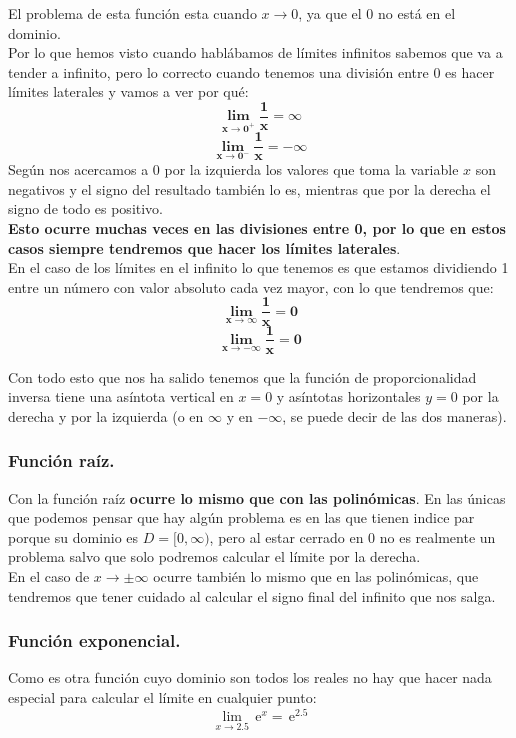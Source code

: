 \documentclass[a4paper,11pt,answers]{exam}
\newcommand{\e}{\,\mathrm{e}}
\begin{document}
El problema de esta función esta cuando $x \to 0$, ya que el 0 no está en el dominio.\\
Por lo que hemos visto cuando hablábamos de límites infinitos sabemos que va a tender a infinito, pero lo correcto cuando tenemos una división entre 0 es hacer límites laterales y vamos a ver por qué:
\[\boldsymbol{\lim_{x \to 0^+}\frac{1}{x} = \infty}\]
\[\boldsymbol{\lim_{x \to 0^-}\frac{1}{x} = -\infty}\]
Según nos acercamos a 0 por la izquierda los valores que toma la variable $x$ son negativos y el signo del resultado también lo es, mientras que por la derecha el signo de todo es positivo.\\
\textbf{Esto ocurre muchas veces en las divisiones entre 0, por lo que en estos casos siempre tendremos que hacer los límites laterales}.\\

En el caso de los límites en el infinito lo que tenemos es que estamos dividiendo 1 entre un número con valor absoluto cada vez mayor, con lo que tendremos que:
\[\boldsymbol{\lim_{x \to \infty} \frac{1}{x} = 0}\]
\[\boldsymbol{\lim_{x \to -\infty} \frac{1}{x} = 0}\]

Con todo esto que nos ha salido tenemos que la función de proporcionalidad inversa tiene una asíntota vertical en $x=0$ y asíntotas horizontales $y = 0$ por la derecha y por la izquierda (o en $\infty$ y en $-\infty$, se puede decir de las dos maneras).
\subsubsection{Función raíz.}
Con la función raíz \textbf{ocurre lo mismo que con las polinómicas}. En las únicas que podemos pensar que hay algún problema es en las que tienen indice par porque su dominio es $D=[0, \infty)$, pero al estar cerrado en 0 no es realmente un problema salvo que solo podremos calcular el límite por la derecha.\\

En el caso de $x \to \pm\infty$ ocurre también lo mismo que en las polinómicas, que tendremos que tener cuidado al calcular el signo final del infinito que nos salga.

\subsubsection{Función exponencial.}
Como es otra función cuyo dominio son todos los reales no hay que hacer nada especial para calcular el límite en cualquier punto:
\[\lim_{x \to 2.5} \e^x = \e^{2.5}\]
\end{document}

